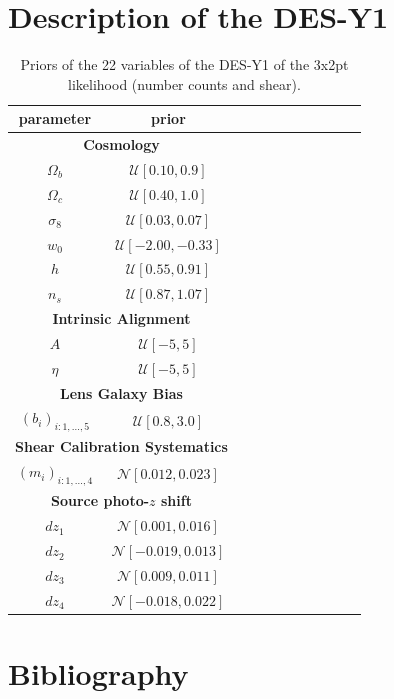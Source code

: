 \documentclass[final,5p,times,twocolumn,authoryear]{elsarticle}
\begin{document}
\section{Description of the DES-Y1}
\label{app-DESY1}
\begin{table}[htb]
\caption{Priors of the 22 variables of the DES-Y1 of the 3x2pt likelihood (number counts and shear).}
\label{tab-DESY1}
 \centering
\begin{tabular}{ccccccccccc}
\hline
 parameter &  prior \\
 \hline
  \multicolumn{2}{c}{\textbf{Cosmology}} \\
$\Omega_b$ & $\mathcal{U}[0.10, 0.9]$ \\
$\Omega_c$ & $\mathcal{U}[0.40, 1.0]$ \\
$\sigma_8$ & $\mathcal{U}[0.03, 0.07]$ \\
$w_0$ & $\mathcal{U}[-2.00, -0.33]$ \\
$h$ & $\mathcal{U}[0.55, 0.91]$ \\
$n_s$ & $\mathcal{U}[0.87, 1.07]$ \\
\multicolumn{2}{c}{\textbf{Intrinsic Alignment}} \\
$A$ & $\mathcal{U}[-5,5]$ \\
$\eta$ &$\mathcal{U}[-5,5]$ \\
\multicolumn{2}{c}{\textbf{Lens Galaxy Bias}} \\
$(b_i)_{i:1,\dots,5}$ & $\mathcal{U}[0.8,3.0]$ \\
\multicolumn{2}{c}{\textbf{Shear Calibration Systematics}} \\
$(m_i)_{i:1,\dots,4}$ & $\mathcal{N}[0.012,0.023]$ \\
\multicolumn{2}{c}{\textbf{Source photo-$z$ shift}} \\
$dz_1$ & $\mathcal{N}[0.001,0.016]$ \\
$dz_2$ & $\mathcal{N}[-0.019,0.013]$ \\
$dz_3$ & $\mathcal{N}[0.009,0.011]$ \\
$dz_4$ & $\mathcal{N}[-0.018,0.022]$ \\
\hline
\end{tabular}
\end{table}



\section*{Bibliography}
 
\typeout{}


\end{document}
